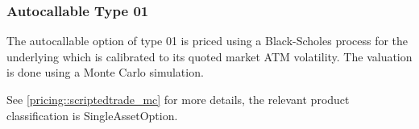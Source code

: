 \subsubsection{Autocallable Type 01}
\label{pricing::autocallable_01}

The autocallable option of type 01 is priced using a Black-Scholes process for the underlying which is calibrated to its
quoted market ATM volatility. The valuation is done using a Monte Carlo simulation.

See \ref{pricing::scriptedtrade_mc} for more details, the relevant product classification is SingleAssetOption.
